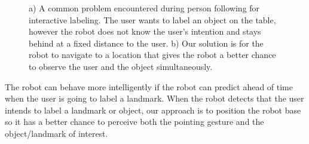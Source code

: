 \documentclass[3p]{elsarticle}
\begin{document}
\begin{figure}[ht!]
\centering
    \caption{a) A common problem encountered during person following for interactive labeling. The user wants to label an object on the table, however the robot does not know the user's intention and stays behind at a fixed distance to the user. b) Our solution is for the robot to navigate to a location that gives the robot a better chance to observe the user and the object simultaneously.}
   \label{fig:landmark_labeling_example}
\end{figure}


The robot can behave more intelligently if the robot can predict ahead of time when the user is going to label a landmark. When the robot detects that the user intends to label a landmark or object, our approach is to position the robot base so it has a better chance to perceive both the pointing gesture and the object/landmark of interest. 
\end{document}
